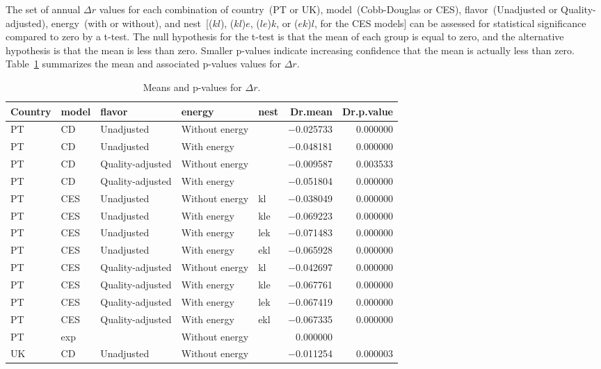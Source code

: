\documentclass[preprint,authoryear,12pt]{elsarticle}\usepackage[]{graphicx}\usepackage[]{color}
\begin{document}
The set of annual $\Delta r$ values for each combination of 
country~(PT or UK), 
model~(Cobb-Douglas or CES),
flavor~(Unadjusted or Quality-adjusted), 
energy~(with or without), and
nest~[($kl$), ($kl$)$e$, ($le$)$k$, or ($ek$)$l$, for the CES models]
can be assessed for statistical significance
compared to zero by a t-test.
The null hypothesis for the t-test is that the mean of each group is
equal to zero, and 
the alternative hypothesis is that the mean is less than zero.
Smaller p-values indicate increasing confidence that the 
mean is actually less than zero.
Table~\ref{tab:Dr_p_values} summarizes the mean 
and associated p-values values for $\Delta r$.
%
\begin{table}[ht]
\centering
\caption{Means and p-values for $\Delta r$.} 
\label{tab:Dr_p_values}
{\tiny
\begin{tabular}{lllllrr}
  \hline
Country & model & flavor & energy & nest & Dr.mean & Dr.p.value \\ 
  \hline
PT & CD & Unadjusted & Without energy &  & $-$0.025733 & 0.000000 \\ 
  PT & CD & Unadjusted & With energy &  & $-$0.048181 & 0.000000 \\ 
  PT & CD & Quality-adjusted & Without energy &  & $-$0.009587 & 0.003533 \\ 
  PT & CD & Quality-adjusted & With energy &  & $-$0.051804 & 0.000000 \\ 
  PT & CES & Unadjusted & Without energy & kl & $-$0.038049 & 0.000000 \\ 
  PT & CES & Unadjusted & With energy & kle & $-$0.069223 & 0.000000 \\ 
  PT & CES & Unadjusted & With energy & lek & $-$0.071483 & 0.000000 \\ 
  PT & CES & Unadjusted & With energy & ekl & $-$0.065928 & 0.000000 \\ 
  PT & CES & Quality-adjusted & Without energy & kl & $-$0.042697 & 0.000000 \\ 
  PT & CES & Quality-adjusted & With energy & kle & $-$0.067761 & 0.000000 \\ 
  PT & CES & Quality-adjusted & With energy & lek & $-$0.067419 & 0.000000 \\ 
  PT & CES & Quality-adjusted & With energy & ekl & $-$0.067335 & 0.000000 \\ 
  PT & exp &  & Without energy &  & 0.000000 &  \\ 
  UK & CD & Unadjusted & Without energy &  & $-$0.011254 & 0.000003 \\ 

\end{tabular}}
\end{table}
\end{document}
